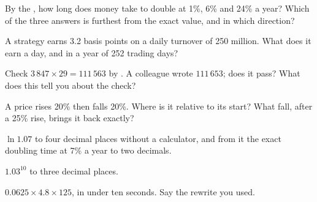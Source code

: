 \begin{interviewq}\label{iq:iv:mental-arithmetic:7}
By the , how long does money take to double at 1\%, 6\% and 24\% a year? Which of the three answers is
furthest from the exact value, and in which direction?
\end{interviewq}

\begin{interviewq}\label{iq:iv:mental-arithmetic:8}
A strategy earns 3.2 basis points on a daily turnover of 250 million. What does it earn a day, and in a year of
252 trading days?
\end{interviewq}

\begin{interviewq}\label{iq:iv:mental-arithmetic:9}
Check $3\,847 \times 29 = 111\,563$ by . A colleague wrote $111\,653$; does it pass? What does
this tell you about the check?
\end{interviewq}

\begin{interviewq}\label{iq:iv:mental-arithmetic:10}
A price rises 20\% then falls 20\%. Where is it relative to its start? What fall, after a 25\% rise, brings it
back exactly?
\end{interviewq}

\begin{interviewq}\label{iq:iv:mental-arithmetic:11}
$\ln 1.07$ to four decimal places without a calculator, and from it the exact doubling time at 7\% a year to two
decimals.
\end{interviewq}

\begin{interviewq}\label{iq:iv:mental-arithmetic:12}
$1.03^{10}$ to three decimal places.
\end{interviewq}

\begin{interviewq}\label{iq:iv:mental-arithmetic:13}
$0.0625 \times 4.8 \times 125$, in under ten seconds. Say the rewrite you used.
\end{interviewq}

